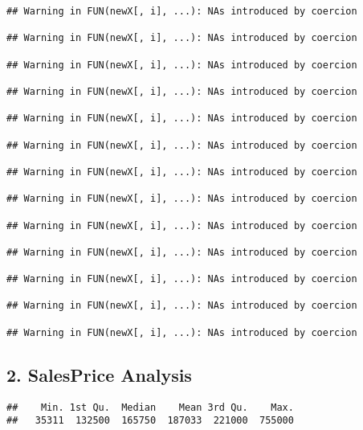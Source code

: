 \documentclass[]{article}
\newenvironment{Shaded}{\begin{snugshade}}{\end{snugshade}}
\newcommand{\KeywordTok}[1]{\textcolor[rgb]{0.13,0.29,0.53}{\textbf{#1}}}
\newcommand{\DataTypeTok}[1]{\textcolor[rgb]{0.13,0.29,0.53}{#1}}
\newcommand{\DecValTok}[1]{\textcolor[rgb]{0.00,0.00,0.81}{#1}}
\newcommand{\OtherTok}[1]{\textcolor[rgb]{0.56,0.35,0.01}{#1}}
\newcommand{\OperatorTok}[1]{\textcolor[rgb]{0.81,0.36,0.00}{\textbf{#1}}}
\newcommand{\NormalTok}[1]{#1}
\begin{document}
\begin{verbatim}
## Warning in FUN(newX[, i], ...): NAs introduced by coercion

## Warning in FUN(newX[, i], ...): NAs introduced by coercion

## Warning in FUN(newX[, i], ...): NAs introduced by coercion

## Warning in FUN(newX[, i], ...): NAs introduced by coercion

## Warning in FUN(newX[, i], ...): NAs introduced by coercion

## Warning in FUN(newX[, i], ...): NAs introduced by coercion

## Warning in FUN(newX[, i], ...): NAs introduced by coercion

## Warning in FUN(newX[, i], ...): NAs introduced by coercion

## Warning in FUN(newX[, i], ...): NAs introduced by coercion

## Warning in FUN(newX[, i], ...): NAs introduced by coercion

## Warning in FUN(newX[, i], ...): NAs introduced by coercion

## Warning in FUN(newX[, i], ...): NAs introduced by coercion

## Warning in FUN(newX[, i], ...): NAs introduced by coercion
\end{verbatim}

\subsection{2. SalesPrice Analysis}\label{salesprice-analysis}

\begin{Shaded}
\end{Shaded}

\begin{verbatim}
##    Min. 1st Qu.  Median    Mean 3rd Qu.    Max. 
##   35311  132500  165750  187033  221000  755000
\end{verbatim}

\begin{Shaded}
\end{Shaded}
\end{document}
